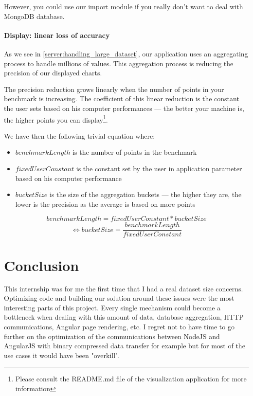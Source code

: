 \documentclass[a4paper,11pt]{report}
\begin{document}
However, you could use our import module if you really don't want to deal with MongoDB database.

\subsubsection{Display: linear loss of accuracy}

As we see in \ref{server:handling_large_dataset}, our application uses an aggregating process to handle millions of values. This aggregation process is reducing the precision of our displayed charts.

The precision reduction grows linearly when the number of points in your benchmark is increasing. The coefficient of this linear reduction is the constant the user sets based on his computer performances --- the better your machine is, the higher points you can display\footnote{Please consult the README.md file of the visualization application for more information}. 

We have then the following trivial equation where: 
\begin{itemize}
\item
$benchmarkLength$ is the number of points in the benchmark
\item
$fixedUserConstant$ is the constant set by the user in application parameter based on his computer performance
\item
$bucketSize$ is the size of the aggregation buckets --- the higher they are, the lower is the precision as the average is based on more points
\end{itemize}

$$ benchmarkLength = fixedUserConstant * bucketSize $$
$$\Longleftrightarrow bucketSize = \frac{benchmarkLength}{fixedUserConstant} $$

\clearpage

\chapter*{Conclusion}

This internship was for me the first time that I had a real dataset size concerns. Optimizing code and building our solution around these issues were the most interesting parts of this project. Every single mechanism could become a bottleneck when dealing with this amount of data, database aggregation, HTTP communications, Angular page rendering, etc. I regret not to have time to go further on the optimization of the communications between NodeJS and AngularJS with binary compressed data transfer for example but for most of the use cases it would have been "overkill".
\end{document}
